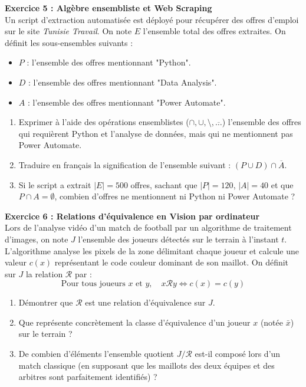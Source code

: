 \textbf{Exercice 5 : Algèbre ensembliste et Web Scraping} \\
Un script d'extraction automatisée est déployé pour récupérer des offres d'emploi sur le site \textit{Tunisie Travail}. On note $E$ l'ensemble total des offres extraites. 
On définit les sous-ensembles suivants :
\begin{itemize}
    \item $P$ : l'ensemble des offres mentionnant "Python".
    \item $D$ : l'ensemble des offres mentionnant "Data Analysis".
    \item $A$ : l'ensemble des offres mentionnant "Power Automate".
\end{itemize}
\begin{enumerate}
    \item Exprimer à l'aide des opérations ensemblistes ($\cap, \cup, \setminus, \overline{\dots}$) l'ensemble des offres qui requièrent Python et l'analyse de données, mais qui ne mentionnent pas Power Automate.
    \item Traduire en français la signification de l'ensemble suivant : $(P \cup D) \cap \overline{A}$.
    \item Si le script a extrait $|E| = 500$ offres, sachant que $|P| = 120$, $|A| = 40$ et que $P \cap A = \emptyset$, combien d'offres ne mentionnent ni Python ni Power Automate ?
\end{enumerate}

\textbf{Exercice 6 : Relations d'équivalence en Vision par ordinateur} \\
Lors de l'analyse vidéo d'un match de football par un algorithme de traitement d'images, on note $J$ l'ensemble des joueurs détectés sur le terrain à l'instant $t$.
L'algorithme analyse les pixels de la zone délimitant chaque joueur et calcule une valeur $c(x)$ représentant le code couleur dominant de son maillot.
On définit sur $J$ la relation $\mathcal{R}$ par :
$$ \text{Pour tous joueurs } x \text{ et } y, \quad x \mathcal{R} y \iff c(x) = c(y) $$
\begin{enumerate}
    \item Démontrer que $\mathcal{R}$ est une relation d'équivalence sur $J$.
    \item Que représente concrètement la classe d'équivalence d'un joueur $x$ (notée $\bar{x}$) sur le terrain ?
    \item De combien d'éléments l'ensemble quotient $J/\mathcal{R}$ est-il composé lors d'un match classique (en supposant que les maillots des deux équipes et des arbitres sont parfaitement identifiés) ?
\end{enumerate}

